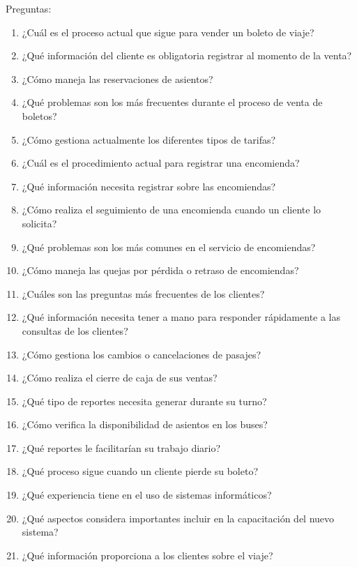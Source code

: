 	Preguntas:
	
	\begin{enumerate}[left=0.1cm, labelsep = 0.9cm, topsep = 0pt, parsep = 0pt]
		\item ¿Cuál es el proceso actual que sigue para vender un boleto de viaje?
		\item ¿Qué información del cliente es obligatoria registrar al momento de la venta?
		\item ¿Cómo maneja las reservaciones de asientos?
		\item ¿Qué problemas son los más frecuentes durante el proceso de venta de boletos?
		\item ¿Cómo gestiona actualmente los diferentes tipos de tarifas?
		\item ¿Cuál es el procedimiento actual para registrar una encomienda?
		\item ¿Qué información necesita registrar sobre las encomiendas?
		\item ¿Cómo realiza el seguimiento de una encomienda cuando un cliente lo solicita?
		\item ¿Qué problemas son los más comunes en el servicio de encomiendas?
		\item ¿Cómo maneja las quejas por pérdida o retraso de encomiendas?
		\item ¿Cuáles son las preguntas más frecuentes de los clientes?
		\item ¿Qué información necesita tener a mano para responder rápidamente a las consultas de los clientes?
		\item ¿Cómo gestiona los cambios o cancelaciones de pasajes?
		\item ¿Cómo realiza el cierre de caja de sus ventas?
		\item ¿Qué tipo de reportes necesita generar durante su turno?
		\item ¿Cómo verifica la disponibilidad de asientos en los buses?
		\item ¿Qué reportes le facilitarían su trabajo diario?
		\item ¿Qué proceso sigue cuando un cliente pierde su boleto?
		\item ¿Qué experiencia tiene en el uso de sistemas informáticos?
		\item ¿Qué aspectos considera importantes incluir en la capacitación del nuevo sistema?
		\item ¿Qué información proporciona a los clientes sobre el viaje?
	\end{enumerate}
	
